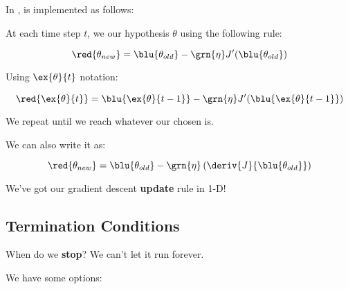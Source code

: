     \begin{kequation}
        In ,  is implemented as follows:
    
        At each time step $t$, we  our hypothesis $\theta$ using the following rule:
        
        \begin{equation*}
            \red{ \theta_{new} } = 
            \blu{ \theta_{old} } - \grn{\eta} J'( \blu{ \theta_{old} })
        \end{equation*}
        
        Using $\ex{\theta}{t}$ notation:
        
        \begin{equation*}
            \red{ \ex{\theta}{t} } = 
            \blu{ \ex{\theta}{t-1} } -
            \grn{\eta} J'( \blu{ \ex{\theta}{t-1} })
        \end{equation*}
        
        We repeat until we reach whatever our chosen  is.
    \end{kequation}
    
    We can also write it as:
    
    \begin{equation*}
            \red{ \theta_{new} } = 
            \blu{ \theta_{old} } - 
            \grn{\eta} 
            \left( \deriv{J}{ \blu{ \theta_{old} }} \right)
        \end{equation*}
    
    We've got our gradient descent \textbf{update} rule in 1-D!

\subsection*{Termination Conditions}

    When do we \textbf{stop}? We can't let it run forever.
    
    We have some options:
    
